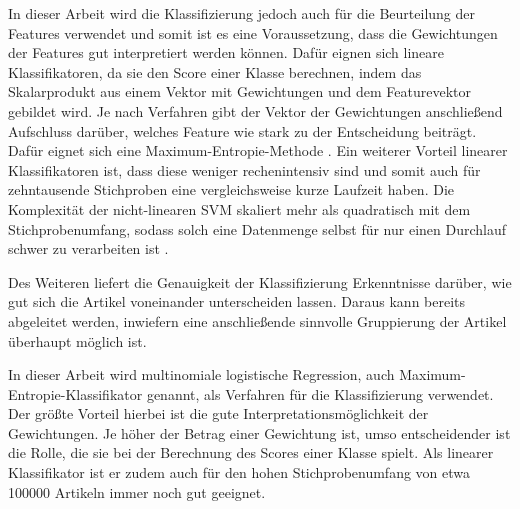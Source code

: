 In dieser Arbeit wird die Klassifizierung jedoch auch für die Beurteilung der Features verwendet und somit ist es eine Voraussetzung, dass die Gewichtungen der Features gut interpretiert werden können. Dafür eignen sich lineare Klassifikatoren, da sie den Score einer Klasse berechnen, indem das Skalarprodukt aus einem Vektor mit Gewichtungen und dem Featurevektor gebildet wird. Je nach Verfahren gibt der Vektor der Gewichtungen anschließend Aufschluss darüber, welches Feature wie stark zu der Entscheidung beiträgt. Dafür eignet sich eine Maximum-Entropie-Methode \cite[K.~2]{cimino2017identifying}. Ein weiterer Vorteil linearer Klassifikatoren ist, dass diese weniger rechenintensiv sind und somit auch für zehntausende Stichproben eine vergleichsweise kurze Laufzeit haben. Die Komplexität der nicht-linearen SVM skaliert mehr als quadratisch mit dem Stichprobenumfang, sodass solch eine Datenmenge selbst für nur einen Durchlauf schwer zu verarbeiten ist \cite[Seite: sklearn.svm.SVC]{scikitlearnAPIReference}.

Des Weiteren liefert die Genauigkeit der Klassifizierung Erkenntnisse darüber, wie gut sich die Artikel voneinander unterscheiden lassen. Daraus kann bereits abgeleitet werden, inwiefern eine anschließende sinnvolle Gruppierung der Artikel überhaupt möglich ist.

In dieser Arbeit wird multinomiale logistische Regression, auch Maximum-Entropie-Klassifikator genannt, als Verfahren für die Klassifizierung verwendet. Der größte Vorteil hierbei ist die gute Interpretationsmöglichkeit der Gewichtungen. Je höher der Betrag einer Gewichtung ist, umso entscheidender ist die Rolle, die sie bei der Berechnung des Scores einer Klasse spielt. Als linearer Klassifikator ist er zudem auch für den hohen Stichprobenumfang von etwa 100000 Artikeln immer noch gut geeignet.

